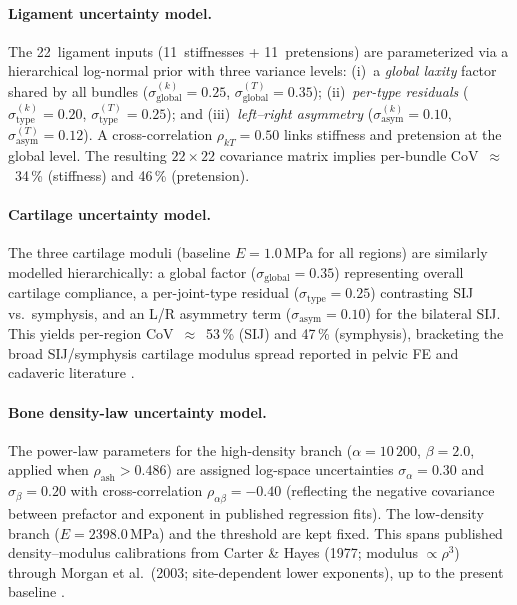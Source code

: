 \documentclass[11pt]{article}
\begin{document}
\paragraph{Ligament uncertainty model.}
The 22~ligament inputs (11~stiffnesses + 11~pretensions) are parameterized via a hierarchical log-normal prior with three variance levels:
(i)~a \emph{global laxity} factor shared by all bundles ($\sigma_{\text{global}}^{(k)}=0.25$, $\sigma_{\text{global}}^{(T)}=0.35$);
(ii)~\emph{per-type residuals} ($\sigma_{\text{type}}^{(k)}=0.20$, $\sigma_{\text{type}}^{(T)}=0.25$); and
(iii)~\emph{left--right asymmetry} ($\sigma_{\text{asym}}^{(k)}=0.10$, $\sigma_{\text{asym}}^{(T)}=0.12$).
A cross-correlation $\rho_{kT}=0.50$ links stiffness and pretension at the global level.
The resulting $22{\times}22$ covariance matrix implies per-bundle CoV~$\approx$~34\,\% (stiffness) and 46\,\% (pretension).

\paragraph{Cartilage uncertainty model.}
The three cartilage moduli (baseline $E=1.0$\,MPa for all regions) are similarly modelled hierarchically:
a global factor ($\sigma_{\text{global}}=0.35$) representing overall cartilage compliance,
a per-joint-type residual ($\sigma_{\text{type}}=0.25$) contrasting SIJ vs.\ symphysis, and
an L/R asymmetry term ($\sigma_{\text{asym}}=0.10$) for the bilateral SIJ.
This yields per-region CoV~$\approx$~53\,\% (SIJ) and 47\,\% (symphysis), bracketing the broad SIJ/symphysis cartilage modulus spread reported in pelvic FE and cadaveric literature \citep{Anderson2020,Calixte2022,Song2021}.

\paragraph{Bone density-law uncertainty model.}
The power-law parameters for the high-density branch ($\alpha=10\,200$, $\beta=2.0$, applied when $\rho_{\mathrm{ash}} > 0.486$) are assigned log-space uncertainties $\sigma_\alpha=0.30$ and $\sigma_\beta=0.20$ with cross-correlation $\rho_{\alpha\beta}=-0.40$ (reflecting the negative covariance between prefactor and exponent in published regression fits). The low-density branch ($E=2398.0$\,MPa) and the threshold are kept fixed.
This spans published density--modulus calibrations from Carter \& Hayes (1977; modulus $\propto \rho^3$) through Morgan et al.\ (2003; site-dependent lower exponents), up to the present baseline \citep{CarterHayes1977,Morgan2003Trabecular}.
\end{document}
